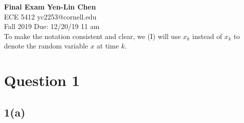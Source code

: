 \documentclass[a4paper, 11pt]{article}
\begin{document}
\noindent
\large\textbf{Final Exam} \hfill \textbf{Yen-Lin Chen} \\
\normalsize ECE 5412 \hfill yc2253@cornell.edu \\
Fall 2019 \hfill Due: 12/20/19 11 am\\

To make the notation consistent and clear, we (I) will use $x_k$ instead of $x_k$ to denote the random variable $x$ at time $k$. 

\section*{Question 1}

\subsection*{1(a)}
\end{document}
